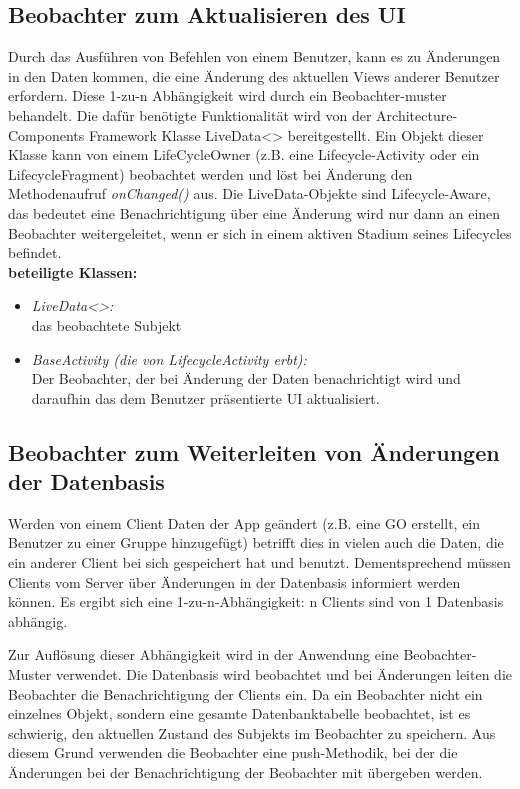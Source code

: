 \documentclass[11pt,a4paper]{article}
\begin{document}
\subsection{Beobachter zum Aktualisieren des UI}
Durch das Ausführen von Befehlen von einem Benutzer, kann es zu Änderungen in den Daten kommen, die eine Änderung des aktuellen Views anderer Benutzer erfordern. Diese 1-zu-n Abhängigkeit wird durch ein Beobachter-muster behandelt. Die dafür benötigte Funktionalität wird von der Architecture-Components Framework Klasse LiveData<> bereitgestellt. Ein Objekt dieser Klasse kann von einem LifeCycleOwner (z.B. eine Lifecycle-Activity oder ein LifecycleFragment) beobachtet werden und löst bei Änderung den Methodenaufruf \textit{onChanged()} aus. Die LiveData-Objekte sind Lifecycle-Aware, das bedeutet eine Benachrichtigung über eine Änderung wird nur dann an einen Beobachter weitergeleitet, wenn er sich in einem aktiven Stadium seines Lifecycles befindet.\\
\textbf{beteiligte Klassen:}
\begin{itemize}
	\item \textit{LiveData<>:}\\ das beobachtete Subjekt
	\item \textit{BaseActivity (die von LifecycleActivity erbt):}\\ Der Beobachter, der bei Änderung der Daten benachrichtigt wird und daraufhin das dem Benutzer präsentierte UI aktualisiert.
\end{itemize}

\subsection{Beobachter zum Weiterleiten von Änderungen der Datenbasis}
Werden von einem Client Daten der App geändert (z.B. eine GO erstellt, ein Benutzer zu einer Gruppe hinzugefügt) betrifft dies in vielen auch die Daten, die ein anderer Client bei sich gespeichert hat und benutzt. Dementsprechend müssen Clients vom Server über Änderungen in der Datenbasis informiert werden können. Es ergibt sich eine 1-zu-n-Abhängigkeit: n Clients sind von 1 Datenbasis abhängig.

Zur Auflösung dieser Abhängigkeit wird in der Anwendung eine Beobachter-Muster verwendet. Die Datenbasis wird beobachtet und bei Änderungen leiten die Beobachter die Benachrichtigung der Clients
ein. Da ein Beobachter nicht ein einzelnes Objekt, sondern eine gesamte Datenbanktabelle beobachtet, ist es schwierig, den aktuellen Zustand des Subjekts im Beobachter zu speichern. Aus diesem Grund verwenden die Beobachter eine push-Methodik, bei der die Änderungen bei der Benachrichtigung der Beobachter mit übergeben werden.
\end{document}
